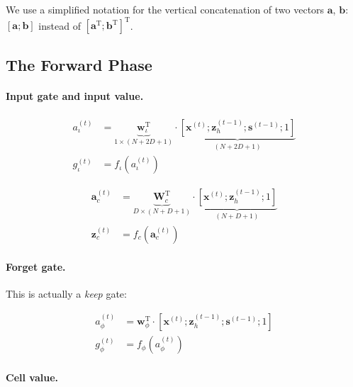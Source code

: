 \documentclass[11pt]{article}
\begin{document}
We use a simplified notation for the vertical concatenation of two vectors $\mathbf{a}$, $\mathbf{b}$: $\left[\mathbf{a}; \mathbf{b}\right]$ instead of $\left[ \mathbf{a}^{\text{T}} ; \mathbf{b}^{\text{T}} \right]^{\text{T}}$.

\begin{center}

\end{center}

\subsection{The Forward Phase}

\paragraph{Input gate and input value.}

\begin{align}
a_{\iota}^{(t)} &= \underbrace{\mathbf{w}_{\iota}^{\text{T}}}_{1\times(N+2D+1)} \cdot \underbrace{\left[\mathbf{x}^{(t)}; \mathbf{z}_{h}^{(t-1)}; \mathbf{s}^{(t-1)}; 1\right]}_{(N+2D+1)} \\
g_{\iota}^{(t)} &= f_{\iota}\left(a_{\iota}^{(t)}\right)
\end{align}

\begin{align}
\mathbf{a}_{c}^{(t)} &= \underbrace{\mathbf{W}_{c}^{\text{T}}}_{D \times (N+D+1)} \cdot \underbrace{\left[\mathbf{x}^{(t)}; \mathbf{z}_{h}^{(t-1)}; 1\right]}_{(N+D+1)} \\
\mathbf{z}_{c}^{(t)} &= f_{c}\left(\mathbf{a}_{c}^{(t)}\right)
\end{align}

\paragraph{Forget gate.} This is actually a \emph{keep} gate:

\begin{align}
a_{\phi}^{(t)} &= \mathbf{w}_{\phi}^{\text{T}} \cdot \left[\mathbf{x}^{(t)}; \mathbf{z}_{h}^{(t-1)}; \mathbf{s}^{(t-1)}; 1\right] \\
g_{\phi}^{(t)} &= f_{\phi}\left(a_{\phi}^{(t)}\right)
\end{align}

\paragraph{Cell value.}
\end{document}
